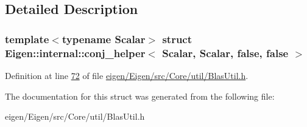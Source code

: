 \subsection{Detailed Description}
\subsubsection*{template$<$typename Scalar$>$\newline
struct Eigen\+::internal\+::conj\+\_\+helper$<$ Scalar, Scalar, false, false $>$}



Definition at line \hyperlink{eigen_2_eigen_2src_2_core_2util_2_blas_util_8h_source_l00072}{72} of file \hyperlink{eigen_2_eigen_2src_2_core_2util_2_blas_util_8h_source}{eigen/\+Eigen/src/\+Core/util/\+Blas\+Util.\+h}.



The documentation for this struct was generated from the following file\+:\begin{DoxyCompactItemize}
\item 
eigen/\+Eigen/src/\+Core/util/\+Blas\+Util.\+h\end{DoxyCompactItemize}
